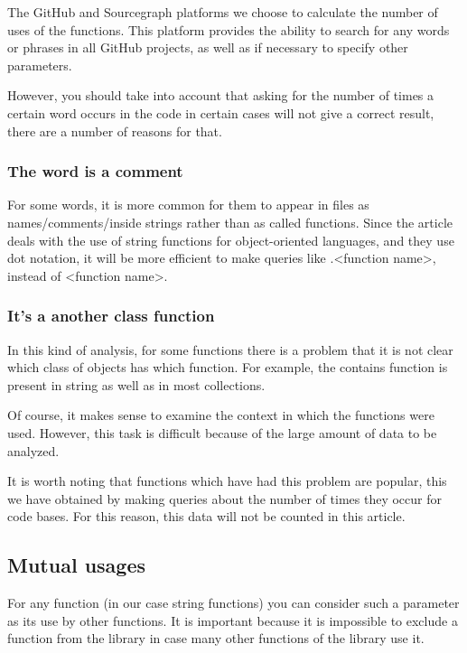 \documentclass[anonymous,sigplan,review,11pt,nonacm,natbib=false]{acmart}
\begin{document}
    The GitHub and Sourcegraph platforms we choose to calculate the number of uses of the functions. This platform provides the ability to search for any words or phrases in all GitHub projects, as well as if necessary to specify other parameters.

    However, you should take into account that asking for the number of times a certain word occurs in the code in certain cases will not give a correct result, there are a number of reasons for that.

    \subsubsection{The word is a comment} \hl{}

    For some words, it is more common for them to appear in files as names/comments/inside strings rather than as called functions. Since the article deals with the use of string functions for object-oriented languages, and they use dot notation, it will be more efficient to make queries like .<function name>, instead of <function name>.

    \subsubsection{It's a another class function} \hl{}

    In this kind of analysis, for some functions there is a problem that it is not clear which class of objects has which function. For example, the contains function is present in string as well as in most collections.

    Of course, it makes sense to examine the context in which the functions were used. However, this task is difficult because of the large amount of data to be analyzed.

    It is worth noting that functions which have had this problem are popular, this we have obtained by making queries about the number of times they occur for code bases. For this reason, this data will not be counted in this article.

    \subsection{Mutual usages}

    For any function (in our case string functions) you can consider such a parameter as its use by other functions. It is important because it is impossible to exclude a function from the library in case many other functions of the library use it.
\end{document}
